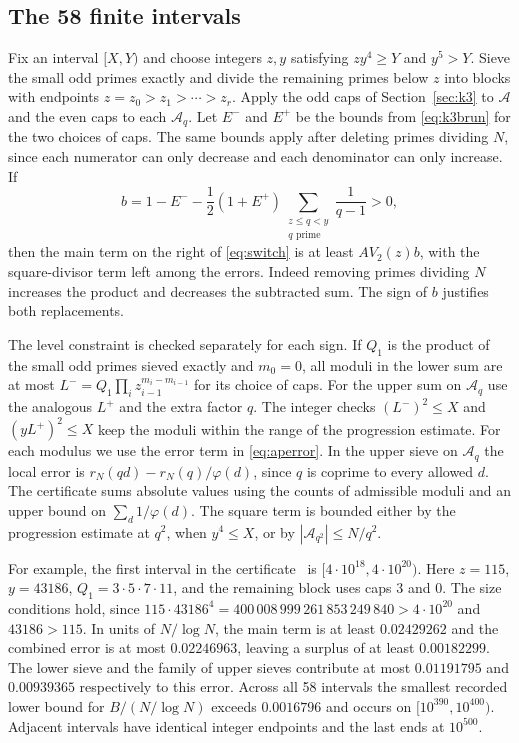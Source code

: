 \documentclass[11pt]{article}
\theoremstyle{remark}\newtheorem{remark}[theorem]{Remark}
\begin{document}
\subsection{The 58 finite intervals}
Fix an interval $[X,Y)$ and choose integers $z,y$ satisfying $zy^4\ge Y$ and $y^5>Y$. Sieve the small odd primes exactly and divide the remaining primes below $z$ into blocks with endpoints $z=z_0>z_1>\cdots>z_r$. Apply the odd caps of Section~\ref{sec:k3} to $\mathcal A$ and the even caps to each $\mathcal A_q$. Let $E^-$ and $E^+$ be the bounds from \eqref{eq:k3brun} for the two choices of caps. The same bounds apply after deleting primes dividing $N$, since each numerator can only decrease and each denominator can only increase.
If
\[
 b=1-E^- -\frac12(1+E^+)\sum_{\substack{z\le q<y\\q\text{ prime}}}\frac1{q-1}>0,
\]
then the main term on the right of \eqref{eq:switch} is at
least $A V_2(z)b$, with the square-divisor term left among
the errors. Indeed removing primes dividing $N$ increases the product
and decreases the subtracted sum. The sign of $b$ justifies both
replacements.

The level constraint is checked separately for each sign. If $Q_1$ is the
product of the small odd primes sieved exactly and $m_0=0$, all moduli
in the lower sum are at most
$L^-=Q_1\prod_i z_{i-1}^{m_i-m_{i-1}}$ for its choice of caps.
For the upper sum on $\mathcal A_q$ use the analogous $L^+$ and the extra
factor $q$. The integer checks $(L^-)^2\le X$ and $(yL^+)^2\le X$
keep the moduli within the range of the progression estimate.
For each modulus we use the error term in
\eqref{eq:aperror}. In the upper sieve on $\mathcal A_q$ the local error is
$r_N(qd)-r_N(q)/\varphi(d)$, since $q$ is coprime to every allowed $d$.
The certificate sums absolute values using the counts of admissible
moduli and an upper bound on $\sum_d1/\varphi(d)$.
The square term is bounded either by the progression estimate at $q^2$,
when $y^4\le X$, or by $|\mathcal A_{q^2}|\le N/q^2$.

For example, the first interval in the certificate~\cite{Repo} is $[4\cdot10^{18},4\cdot10^{20})$.
Here $z=115$, $y=43186$, $Q_1=3\cdot5\cdot7\cdot11$, and the remaining
block uses caps $3$ and $0$. The size conditions hold, since $115\cdot43186^4=400\,008\,999\,261\,853\,249\,840>4\cdot10^{20}$ and $43186>115$. In units of $N/\log N$, the main term is
at least $0.02429262$ and the combined error is at most $0.02246963$, leaving a surplus of at least $0.00182299$. The lower sieve and the family of upper sieves contribute at most $0.01191795$ and $0.00939365$ respectively to this error.
Across all 58 intervals the smallest recorded lower bound for
$B/(N/\log N)$ exceeds $0.0016796$ and occurs on
$[10^{390},10^{400})$. Adjacent intervals have identical integer
endpoints and the last ends at $10^{500}$.
\end{document}
